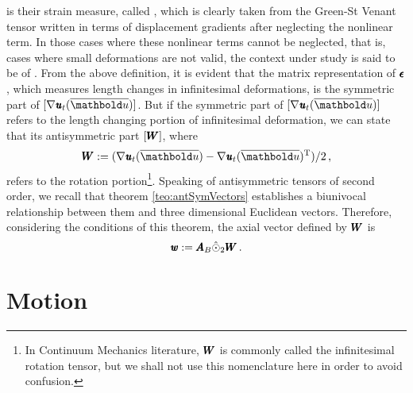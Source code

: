 is their strain measure, called , which is clearly taken from the Green-St Venant tensor written in terms of displacement gradients after neglecting the nonlinear term.
In those cases where these nonlinear terms cannot be neglected, that is, cases where small deformations are not valid, the context under study is said to be of . From the above definition, it is evident that the matrix representation of $\pmb{\epsilon}$, which measures length changes in infinitesimal deformations, is the symmetric part of $[\fua{\nabla\tnr{\mathit{u}}_t}{\overline{\vto{u}}}]$. But if the symmetric part of $[\fua{\nabla\tnr{\mathit{u}}_t}{\overline{\vto{u}}}]$ refers to the length changing portion of infinitesimal deformation, we can state that its antisymmetric part $[\pmb{W}]$, where
\begin{equation}\label{eq:infinitRotation}
\tnr{W}:=(\fua{\nabla\tnr{\mathit{u}}_t}{\overline{\vto{u}}}-\fua{\nabla\tnr{\mathit{u}}_t}{\overline{\vto{u}}}^{\text{T}})/2\,,
\end{equation}
refers to the rotation portion\footnote{In Continuum Mechanics literature, $\pmb{W}$ is commonly called the infinitesimal rotation tensor, but we shall not use this nomenclature here in order to avoid confusion.}. Speaking of antisymmetric tensors of second order, we recall that theorem \ref{teo:antSymVectors} establishes a biunivocal relationship between them and three dimensional Euclidean vectors. Therefore, considering the conditions of this theorem, the axial vector defined by $\pmb{W}$ is  
\begin{equation}\label{eq:vectinfinitRotation}
\pmb{\mathit{w}}:=\pmb{A}_B\hat{\odot}_2 \pmb{W}\,.
\end{equation}


\section{Motion}

